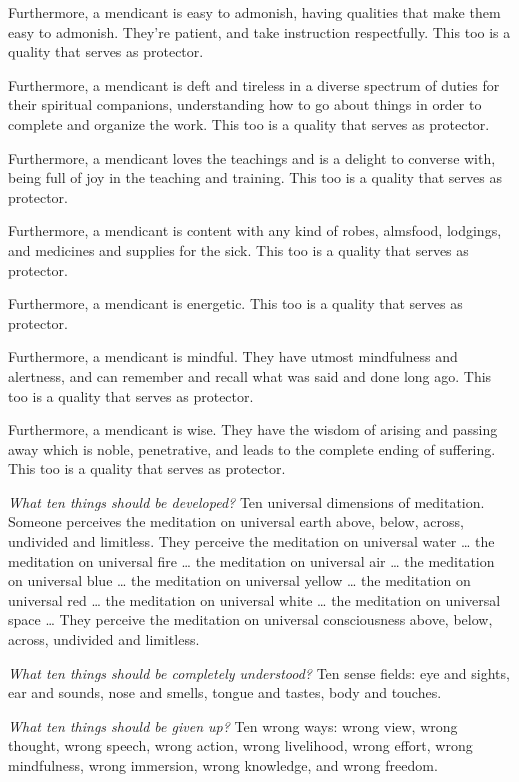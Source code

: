 \documentclass[12pt,openany]{book}%
\begin{document}
Furthermore, a mendicant is easy to admonish, having qualities that make them easy to admonish. They’re patient, and take instruction respectfully. This too is a quality that serves as protector. 

Furthermore, a mendicant is deft and tireless in a diverse spectrum of duties for their spiritual companions, understanding how to go about things in order to complete and organize the work. This too is a quality that serves as protector. 

Furthermore, a mendicant loves the teachings and is a delight to converse with, being full of joy in the teaching and training. This too is a quality that serves as protector. 

Furthermore, a mendicant is content with any kind of robes, almsfood, lodgings, and medicines and supplies for the sick. This too is a quality that serves as protector. 

Furthermore, a mendicant is energetic. This too is a quality that serves as protector. 

Furthermore, a mendicant is mindful. They have utmost mindfulness and alertness, and can remember and recall what was said and done long ago. This too is a quality that serves as protector. 

Furthermore, a mendicant is wise. They have the wisdom of arising and passing away which is noble, penetrative, and leads to the complete ending of suffering. This too is a quality that serves as protector. 

\emph{What ten things should be developed?} Ten universal dimensions of meditation. Someone perceives the meditation on universal earth above, below, across, undivided and limitless. They perceive the meditation on universal water … the meditation on universal fire … the meditation on universal air … the meditation on universal blue … the meditation on universal yellow … the meditation on universal red … the meditation on universal white … the meditation on universal space … They perceive the meditation on universal consciousness above, below, across, undivided and limitless. 

\emph{What ten things should be completely understood?} Ten sense fields: eye and sights, ear and sounds, nose and smells, tongue and tastes, body and touches. 

\emph{What ten things should be given up?} Ten wrong ways: wrong view, wrong thought, wrong speech, wrong action, wrong livelihood, wrong effort, wrong mindfulness, wrong immersion, wrong knowledge, and wrong freedom. 
\end{document}
